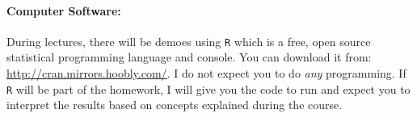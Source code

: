 \paragraph{Computer Software:} During lectures, there will be demoes using \texttt{R} which is a free, open source statistical programming language and console. You can download it from: \url{http://cran.mirrors.hoobly.com/}. I do not expect you to do \textit{any} programming. If \texttt{R} will be part of the homework, I will give you the code to run and expect you to interpret the results based on concepts explained during the course.
